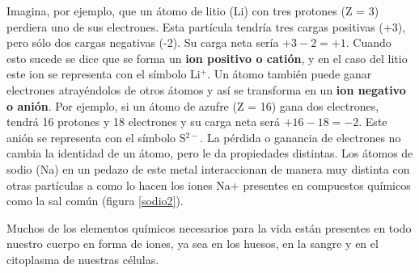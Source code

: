 Imagina, por ejemplo, que un átomo de litio (Li) con tres protones (Z = 3) perdiera uno de sus electrones.
Esta partícula tendría tres cargas positivas (+3), pero sólo dos cargas negativas (-2).
Su carga neta sería $+3 - 2 = +1$. Cuando esto sucede se dice que se forma un \textbf{ion positivo o catión},
y en el caso del litio este ion se representa con el símbolo Li$^+$. Un átomo también puede ganar electrones
atrayéndolos de otros átomos y así se transforma en un \textbf{ion negativo o anión}. Por ejemplo, si un átomo de
azufre (Z = 16) gana dos electrones, tendrá 16 protones y 18 electrones y su carga neta será $+16 - 18 = -2$.
Este anión se representa con el símbolo S$^{2-}$. La pérdida o ganancia de electrones no cambia la identidad de un
átomo, pero le da propiedades distintas. Los átomos de sodio (Na) en un pedazo de este metal interaccionan de
manera muy distinta con otras partículas a como lo hacen los iones Na+ presentes en compuestos químicos como
la sal común (figura \ref{sodio2}).


Muchos de los elementos químicos necesarios para la vida están presentes en todo nuestro cuerpo en forma de
iones, ya sea en los huesos, en la sangre y en el citoplasma de nuestras células.

